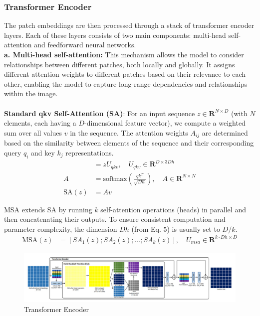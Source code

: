 \subsubsection{Transformer Encoder}
The patch embeddings are then processed through a stack of transformer encoder layers. Each of these layers consists of two main components: multi-head self-attention and feedforward neural networks.
\\


\noindent \textbf{a. Multi-head self-attention:} This mechanism allows the model to consider relationships between different patches, both locally and globally. It assigns different attention weights to different patches based on their relevance to each other, enabling the model to capture long-range dependencies and relationships within the image. \\
\\
\noindent \textbf{Standard qkv Self-Attention (SA)}:
For an input sequence $z \in \mathbf{R}^{N \times D}$ (with $N$ elements, each having a $D$-dimensional feature vector), we compute a weighted sum over all values $v$ in the sequence. The attention weights $A_{ij}$ are determined based on the similarity between elements of the sequence and their corresponding query $q_i$ and key $k_j$ representations.
\begin{align}
    [q, k, v]    & = zU_{qkv}, \quad U_{qkv} \in \mathbf{R}^{D \times 3Dh} \label{eq:qkv}                                               \\
    A            & = \text{softmax}\left(\frac{qk^T}{\sqrt{Dh}}\right), \quad A \in \mathbf{R}^{N \times N} \label{eq:attentionweights} \\
    \text{SA}(z) & = Av \label{eq:selfattention}
\end{align}

\noindent MSA extends SA by running $k$ self-attention operations (heads) in parallel and then concatenating their outputs. To ensure consistent computation and parameter complexity, the dimension $Dh$ (from Eq. 5) is usually set to $D/k$.
\begin{align}
    \text{MSA}(z) & = [SA_1(z); SA_2(z); \ldots ; SA_k(z)], \quad U_{msa} \in \mathbf{R}^{k \cdot Dh \times D} \label{eq:multiheadselfattention}
\end{align}

\begin{figure}[htbp]
    \centering
    \includegraphics[width=6in]{img/encoderdetails.jpg}
    \caption{{Transformer Encoder}}
\end{figure}

